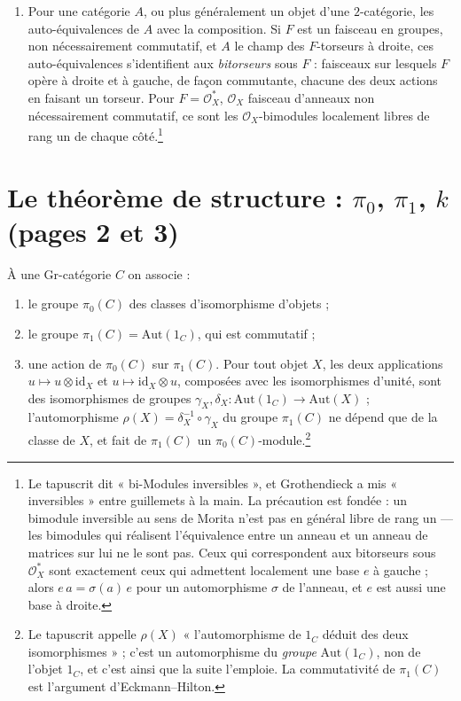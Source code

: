 \documentclass[11pt,a4paper]{article}
\begin{document}
\begin{enumerate}
\item[3.] Pour une catégorie $A$, ou plus généralement un objet d'une
$2$-catégorie, les auto-équivalences de $A$ avec la composition. Si $F$ est un
faisceau en groupes, non nécessairement commutatif, et $A$ le champ des
$F$-torseurs à droite, ces auto-équivalences s'identifient aux
\emph{bitorseurs} sous $F$ : faisceaux sur lesquels $F$ opère à droite et à
gauche, de façon commutante, chacune des deux actions en faisant un torseur.
Pour $F = \mathcal{O}_X^{*}$, $\mathcal{O}_X$ faisceau d'anneaux non
nécessairement commutatif, ce sont les $\mathcal{O}_X$-bimodules localement
libres de rang un de chaque côté.\footnote{Le tapuscrit dit « bi-Modules
inversibles », et Grothendieck a mis « inversibles » entre guillemets à la
main. La précaution est fondée : un bimodule inversible au sens de Morita
n'est pas en général libre de rang un --- les bimodules qui réalisent
l'équivalence entre un anneau et un anneau de matrices sur lui ne le sont
pas. Ceux qui correspondent aux bitorseurs sous $\mathcal{O}_X^{*}$ sont
exactement ceux qui admettent localement une base $e$ à gauche ; alors
$e\,a = \sigma(a)\,e$ pour un automorphisme $\sigma$ de l'anneau, et $e$ est
aussi une base à droite.}
\end{enumerate}

\section*{Le théorème de structure : $\pi_0$, $\pi_1$, $k$ (pages 2 et 3)}

À une Gr-catégorie $C$ on associe :
\begin{enumerate}
\item[a)] le groupe $\pi_0(C)$ des classes d'isomorphisme d'objets ;
\item[b)] le groupe $\pi_1(C) = \mathrm{Aut}(1_C)$, qui est commutatif ;
\item[c)] une action de $\pi_0(C)$ sur $\pi_1(C)$. Pour tout objet $X$, les
deux applications $u \mapsto u \otimes \mathrm{id}_X$ et
$u \mapsto \mathrm{id}_X \otimes u$, composées avec les isomorphismes
d'unité, sont des isomorphismes de groupes
$\gamma_X, \delta_X : \mathrm{Aut}(1_C) \to \mathrm{Aut}(X)$ ;
l'automorphisme $\rho(X) = \delta_X^{-1} \circ \gamma_X$ du groupe
$\pi_1(C)$ ne dépend que de la classe de $X$, et fait de $\pi_1(C)$ un
$\pi_0(C)$-module.\footnote{Le tapuscrit appelle $\rho(X)$ « l'automorphisme
de $1_C$ déduit des deux isomorphismes » ; c'est un automorphisme du
\emph{groupe} $\mathrm{Aut}(1_C)$, non de l'objet $1_C$, et c'est ainsi que
la suite l'emploie. La commutativité de $\pi_1(C)$ est l'argument
d'Eckmann--Hilton.}
\end{enumerate}
\end{document}
